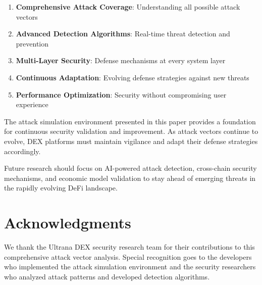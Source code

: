 \documentclass[11pt,a4paper]{article}
\begin{document}
\begin{enumerate}
\item \textbf{Comprehensive Attack Coverage}: Understanding all possible attack vectors
\item \textbf{Advanced Detection Algorithms}: Real-time threat detection and prevention
\item \textbf{Multi-Layer Security}: Defense mechanisms at every system layer
\item \textbf{Continuous Adaptation}: Evolving defense strategies against new threats
\item \textbf{Performance Optimization}: Security without compromising user experience
\end{enumerate}

The attack simulation environment presented in this paper provides a foundation for continuous security validation and improvement. As attack vectors continue to evolve, DEX platforms must maintain vigilance and adapt their defense strategies accordingly.

Future research should focus on AI-powered attack detection, cross-chain security mechanisms, and economic model validation to stay ahead of emerging threats in the rapidly evolving DeFi landscape.

\section{Acknowledgments}

We thank the Ultrana DEX security research team for their contributions to this comprehensive attack vector analysis. Special recognition goes to the developers who implemented the attack simulation environment and the security researchers who analyzed attack patterns and developed detection algorithms.
\end{document}
